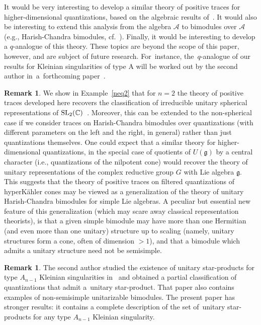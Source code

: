 \documentclass[10pt,a4paper]{amsart}
\newcommand{\mc}[1]{\mathcal{#1}}
\newcommand{\g}{\mathfrak{g}}
\theoremstyle{definition}
\newtheorem{Remark}[Theorem]{Remark}
\numberwithin{equation}{section}
\begin{document}
It would be very interesting to develop a similar theory of positive traces for higher-dimen\-sio\-nal quantizations, based on the algebraic results of~\cite{ES}. It would also be interesting to extend this analysis from the algebra $\mc A$ to bimodules over $\mc A$ (e.g., Harish-Chandra bimodules, cf.~\cite{L}). Finally, it would be interesting to develop a $q$-analogue of this theory.
These topics are beyond the scope of this paper, however, and are subject of future research. For~instance, the~$q$-analogue of our results for Kleinian singularities of type A will be worked out by the second author in~a~forthcoming paper~\cite{K2}.

\begin{Remark} We show in Example~\ref{neq2} that for $n=2$ the theory of positive traces developed here recovers the classification of irreducible unitary spherical representations of ${\rm SL}_2(\mathbb C)$~\cite{V}. Moreover,
this can be extended to the non-spherical case if we consider
traces on Harish-Chandra bimodules over quantizations (with different parameters on the left and the right, in general) rather than just quantizations themselves. One could expect that a similar theory for higher-dimensional quantizations, in the special case of quotients of $U(\g)$ by a central character (i.e., quantizations of the nilpotent cone) would recover the theory of unitary representations of the complex reductive group $G$ with Lie algebra $\g$. This suggests that the theory of positive traces on filtered quantizations of hyperK\"ahler cones may be viewed as a generalization of the theory of unitary Harish-Chandra bimodules for simple Lie algebras. A peculiar but essential new feature of this generalization (which may scare away classical representation theorists), is that a given simple bimodule may have more than one Hermitian (and even more than one unitary) structure up to scaling (namely, unitary structures form a cone, often of dimension $>1$), and that a bimodule which admits a unitary structure need not be semisimple.
\end{Remark}

\begin{Remark}
The second author studied the existence of unitary star-products for type $A_{n-1}$ Kleinian singularities in~\cite{K1} and obtained a partial classification of quantizations that admit a~unitary star-product. That paper also contains examples of non-semisimple unitarizable bimo\-dules. The present paper has stronger results: it contains a complete description of the set of~unitary star-products for any type $A_{n-1}$ Kleinian singularity.
\end{Remark}
\end{document}
